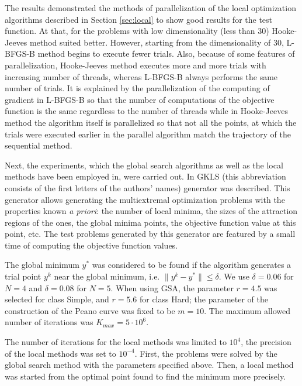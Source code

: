 \documentclass[runningheads]{llncs}
\begin{document}
The results demonstrated the methods of parallelization of the local optimization algorithms described in Section \ref{sec:local} to show good results for the test function. At that, for the problems with low dimensionality (less than 30) Hooke-Jeeves method suited better. However, starting from the dimensionality of 30, L-BFGS-B method begins to execute fewer trials. Also, because of some features of parallelization, Hooke-Jeeves method executes more and more trials with increasing number of threads, whereas L-BFGS-B always performs the same number of trials. It is explained by the parallelization of the computing of gradient in L-BFGS-B so that the number of computations of the objective function is the same regardless to the number of threads while in Hooke-Jeeves method the algorithm itself is parallelized so that not all the points, at which the trials were executed earlier in the parallel algorithm match the trajectory of the sequential method.

Next, the experiments, which the global search algorithms as well as the local methods have been employed in, were carried out. In \cite{Gaviano2003} GKLS (this abbreviation consists of the first letters of the authors' names) generator was described. This generator allows generating the multiextremal optimization problems with the properties known \textit{a priori}: the number of local minima, the sizes of the attraction regions of the ones, the global minima points, the objective function value at this point, etc. The test problems generated by this generator are featured by a small time of computing the objective function values.

The global minimum $y^*$ was considered to be found if the algorithm generates a trial point $y^k$ near the global minimum, i.e. $\|y^k -y^*\| \leq \delta$. 
We use $\delta = 0.06$ for $N=4$ and $\delta = 0.08$ for $N=5$.
When using GSA, the parameter $r=4.5$ was selected for class Simple, and $r=5.6$ for class Hard; the parameter of the construction of the Peano curve was fixed to be $m=10$. The maximum allowed number of iterations was $K_{max}= 5\cdot10^6$.

The number of iterations for the local methods was limited to $10^4$, the precision of the local methods was set to $10^{-4}$. First, the problems were solved by the global search method with the parameters specified above. Then, a local method was started from the optimal point found to find the minimum more precisely.
\end{document}

